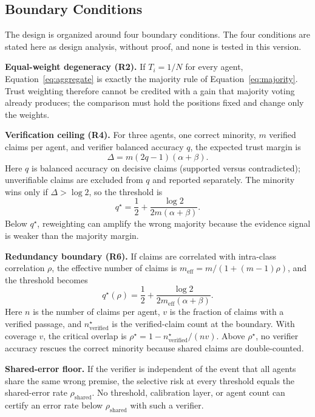 \documentclass[a4paper,fleqn]{cas-sc}
\begin{document}
\subsection{Boundary Conditions}
The design is organized around four boundary conditions. The four conditions are stated here as design analysis, without proof, and none is tested in this version.

\textbf{Equal-weight degeneracy (R2).} If $T_i = 1/N$ for every agent, Equation~\eqref{eq:aggregate} is exactly the majority rule of Equation~\eqref{eq:majority}. Trust weighting therefore cannot be credited with a gain that majority voting already produces; the comparison must hold the positions fixed and change only the weights.

\textbf{Verification ceiling (R4).} For three agents, one correct minority, $m$ verified claims per agent, and verifier balanced accuracy $q$, the expected trust margin is
\begin{equation}\label{eq:margin}
  \Delta = m(2q-1)(\alpha+\beta).
\end{equation}
Here $q$ is balanced accuracy on decisive claims (supported versus contradicted); unverifiable claims are excluded from $q$ and reported separately.
The minority wins only if $\Delta > \log 2$, so the threshold is
\begin{equation}\label{eq:qstar}
  q^{\star} = \frac{1}{2} + \frac{\log 2}{2m(\alpha+\beta)}.
\end{equation}
Below $q^{\star}$, reweighting can amplify the wrong majority because the evidence signal is weaker than the majority margin.

\textbf{Redundancy boundary (R6).} If claims are correlated with intra-class correlation $\rho$, the effective number of claims is $m_{\text{eff}} = m/(1+(m-1)\rho)$, and the threshold becomes
\begin{equation}\label{eq:qstar-rho}
  q^{\star}(\rho) = \frac{1}{2} + \frac{\log 2}{2m_{\text{eff}}(\alpha+\beta)}.
\end{equation}
Here $n$ is the number of claims per agent, $v$ is the fraction of claims with a verified passage, and $n^{\star}_{\text{verified}}$ is the verified-claim count at the boundary. With coverage $v$, the critical overlap is $\rho^{\star} = 1 - n^{\star}_{\text{verified}}/(nv)$. Above $\rho^{\star}$, no verifier accuracy rescues the correct minority because shared claims are double-counted.

\textbf{Shared-error floor.} If the verifier is independent of the event that all agents share the same wrong premise, the selective risk at every threshold equals the shared-error rate $\rho_{\mathrm{shared}}$. No threshold, calibration layer, or agent count can certify an error rate below $\rho_{\mathrm{shared}}$ with such a verifier.
\end{document}
